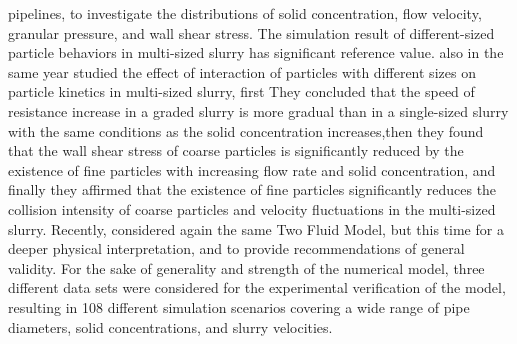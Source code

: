 \documentclass[11pt]{report}
\begin{document}
pipelines, to investigate the distributions of solid concentration, flow velocity, granular pressure, and wall shear stress. The simulation result of different-sized particle behaviors in multi-sized slurry has significant reference value. \citet{Li-2018b} also in the same year studied the effect of interaction of particles with different sizes on particle kinetics in multi-sized slurry, first They concluded that the speed of resistance increase in a graded slurry is more gradual than in a single-sized slurry with the same conditions as the solid concentration increases,then they found that the wall shear stress of coarse particles is significantly reduced by the existence of fine particles with increasing flow rate and solid concentration, and finally they affirmed that the existence of fine particles significantly reduces the collision intensity of coarse particles and velocity fluctuations in the multi-sized slurry. Recently, \citet{Messa-2020} considered again the same Two Fluid Model, but this time for a  deeper physical interpretation, and to provide recommendations of general validity. For the sake of generality and strength of the numerical model, three different data sets were considered for the experimental verification of the model, resulting in 108 different simulation scenarios covering a wide range of pipe diameters, solid concentrations, and slurry velocities.


\end{document}
